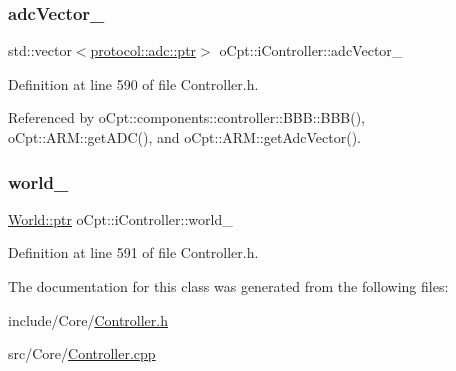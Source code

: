 \subsubsection{\texorpdfstring{adc\+Vector\+\_\+}{adcVector\_}}
{\footnotesize\ttfamily std\+::vector$<$\hyperlink{classo_cpt_1_1protocol_1_1adc_a94af68cb9c573629a4a1a16f8ebd3dff}{protocol\+::adc\+::ptr}$>$ o\+Cpt\+::i\+Controller\+::adc\+Vector\+\_\+\hspace{0.3cm}{\ttfamily [protected]}}



Definition at line 590 of file Controller.\+h.



Referenced by o\+Cpt\+::components\+::controller\+::\+B\+B\+B\+::\+B\+B\+B(), o\+Cpt\+::\+A\+R\+M\+::get\+A\+D\+C(), and o\+Cpt\+::\+A\+R\+M\+::get\+Adc\+Vector().

\hypertarget{classo_cpt_1_1i_controller_a77fe51158891ee7af9d5d92a3ff46b20}{}\label{classo_cpt_1_1i_controller_a77fe51158891ee7af9d5d92a3ff46b20} 
\subsubsection{\texorpdfstring{world\+\_\+}{world\_}}
{\footnotesize\ttfamily \hyperlink{classo_cpt_1_1_world_aa6e591e3096d5de71e0cec9039663d67}{World\+::ptr} o\+Cpt\+::i\+Controller\+::world\+\_\+\hspace{0.3cm}{\ttfamily [protected]}}



Definition at line 591 of file Controller.\+h.



The documentation for this class was generated from the following files\+:\begin{DoxyCompactItemize}
\item 
include/\+Core/\hyperlink{_controller_8h}{Controller.\+h}\item 
src/\+Core/\hyperlink{_controller_8cpp}{Controller.\+cpp}\end{DoxyCompactItemize}
